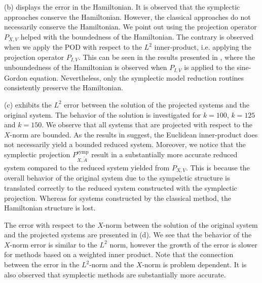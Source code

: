 (b) displays the error in the Hamiltonian. It is observed that the symplectic approaches conserve the Hamiltonian. However, the classical approaches do not necessarily conserve the Hamiltonian. We point out using the projection operator $P_{X,V}$ helped with the boundedness of the Hamiltonian. The contrary is observed when we apply the POD with respect to the $L^2$ inner-product, i.e. applying the projection operator $P_{I,V}$. This can be seen in the results presented in \cite{doi:10.1137/140978922}, where the unboundedness of the Hamiltonian is observed when $P_{I,V}$ is applied to the sine-Gordon equation. Nevertheless, only the symplectic model reduction routines consistently preserve the Hamiltonian.

(c) exhibits the $L^2$ error between the solution of the projected systems and the original system. The behavior of the solution is investigated for $k=100$, $k=125$ and $k=150$. We observe that all systems that are projected with respect to the $X$-norm are bounded. As the results in \cite{doi:10.1137/140978922} suggest, the Euclidean inner-product does not necessarily yield a bounded reduced system. Moreover, we notice that the symplectic projection $P^{\text{symp}}_{X,\tilde A}$ result in a substantially more accurate reduced system compared to the reduced system yielded from $P_{X,V}$. This is because the overall behavior of the original system due to the sympelctic structure is translated correctly to the reduced system constructed with the symplectic projection. Whereas for systems constructed by the classical method, the Hamiltonian structure is lost.

The error with respect to the $X$-norm between the solution of the original system and the projected systems are presented in (d). We see that the behavior of the $X$-norm error is similar to the $L^2$ norm, however the growth of the error is slower for methods based on a weighted inner product. Note that the connection between the error in the $L^2$-norm and the $X$-norm is problem dependent. It is also observed that symplectic methods are substantially more accurate.

